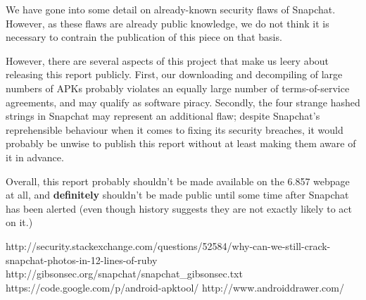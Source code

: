 \documentclass[11pt]{article}
\numberwithin{theorem}{subsection}
\begin{document}
We have gone into some detail on already-known security flaws of Snapchat.  However, as these flaws are already public knowledge\cite{snapchatFlaw1}\cite{snapchatFlaw2}, 
we do not think it is necessary to contrain the publication of this piece on that basis.

However, there are several aspects of this project that make us leery about releasing this report publicly.  First, our downloading and decompiling
of large numbers of APKs probably violates an equally large number of terms-of-service agreements, and may qualify as software piracy.  Secondly, 
the four strange hashed strings in Snapchat may represent an additional flaw; despite Snapchat's reprehensible behaviour when it comes to fixing 
its security breaches, it would probably be unwise to publish this report without at least making them aware of it in advance.

Overall, this report probably shouldn't be made available on the 6.857 webpage at all, and \textbf{definitely} shouldn't be made public until some time after
Snapchat has been alerted (even though history suggests they are not exactly likely to act on it.) 

\begin{thebibliography}{9}

        http://security.stackexchange.com/questions/52584/why-can-we-still-crack-snapchat-photos-in-12-lines-of-ruby
        http://gibsonsec.org/snapchat/snapchat\_gibsonsec.txt
        https://code.google.com/p/android-apktool/
        http://www.androiddrawer.com/

\end{thebibliography}
\end{document}
